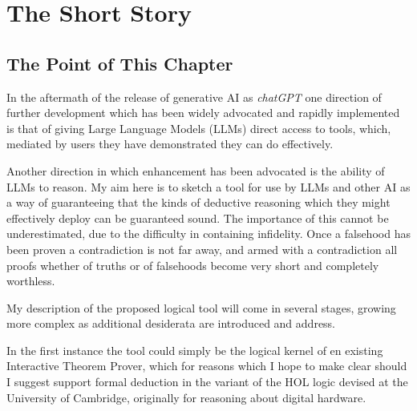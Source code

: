 \chapter{The Short Story}\label{ShortStory}

\section{The Point of This Chapter}

In the aftermath of the release of generative AI as \emph{chatGPT} one direction of further development which has been widely advocated and rapidly implemented is that of giving Large Language Models (LLMs) direct access to tools, which, mediated by users they have demonstrated they can do effectively.

Another direction in which enhancement has been advocated is the ability of LLMs to reason.
My aim here is to sketch a tool for use by LLMs and other AI as a way of guaranteeing that the kinds of deductive reasoning which they might effectively deploy can be guaranteed sound.
The importance of this cannot be underestimated, due to the difficulty in containing infidelity.
Once a falsehood has been proven a contradiction is not far away, and armed with a contradiction all proofs whether of truths or of falsehoods become very short and completely worthless.

My description of the proposed logical tool will come in several stages, growing more complex as additional desiderata are introduced and address.

In the first instance the tool could simply be the logical kernel of en existing Interactive Theorem Prover, which for reasons which I hope to make clear should I suggest support formal deduction in the variant of the HOL logic devised at the University of Cambridge, originally for reasoning about digital hardware.

